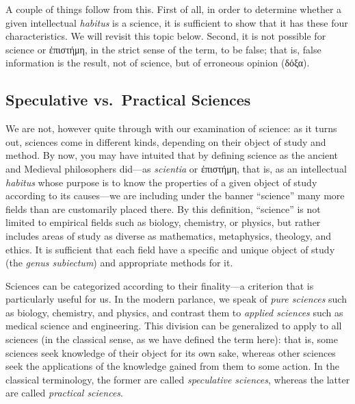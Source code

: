\documentclass[article,12pt,a4paper,oneside]{memoir}
\begin{document}
    A couple of things follow from this. First of all, in order to
    determine whether a given intellectual \emph{habitus} is a science,
    it is sufficient to show that it has these four characteristics. We
    will revisit this topic below. Second, it is not possible for
    science or ἐπιστήμη, in the strict sense of the term, to be false;
    that is, false information is the result, not of science, but of
    erroneous opinion (δόξα).

    \hypertarget{speculative-vs.-practical-sciences}{%
    \subsection{Speculative vs.~Practical
    Sciences}\label{speculative-vs.-practical-sciences}}

    We are not, however quite through with our examination of science:
    as it turns out, sciences come in different kinds, depending on
    their object of study and method. By now, you may have intuited that
    by defining science as the ancient and Medieval philosophers
    did---as \emph{scientia} or ἐπιστήμη, that is, as an intellectual
    \emph{habitus} whose purpose is to know the properties of a given
    object of study according to its causes---we are including under the
    banner ``science'' many more fields than are customarily placed
    there. By this definition, ``science'' is not limited to empirical
    fields such as biology, chemistry, or physics, but rather includes
    areas of study as diverse as mathematics, metaphysics, theology, and
    ethics. It is sufficient that each field have a specific and unique
    object of study (the \emph{genus subiectum}) and appropriate methods
    for it.

    Sciences can be categorized according to their finality---a
    criterion that is particularly useful for us. In the modern
    parlance, we speak of \emph{pure sciences} such as biology,
    chemistry, and physics, and contrast them to \emph{applied sciences}
    such as medical science and engineering. This division can be
    generalized to apply to all sciences (in the classical sense, as we
    have defined the term here): that is, some sciences seek knowledge
    of their object for its own sake, whereas other sciences seek the
    applications of the knowledge gained from them to some action. In
    the classical terminology, the former are called \emph{speculative
    sciences}, whereas the latter are called \emph{practical sciences}.
\end{document}
